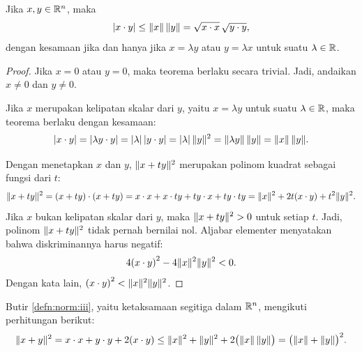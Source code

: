 \begin{thm}
Jika $x, y \in {\mathbb{R}}^n$, maka
\begin{equation*}
\sabs{x \cdot y} \leq \snorm{x} \, \snorm{y} = \sqrt{x\cdot x}\, \sqrt{y\cdot y},
\avoidbreak
\end{equation*}
dengan kesamaan jika dan hanya jika $x = \lambda y$ atau $y = \lambda x$ untuk suatu
$\lambda \in {\mathbb{R}}$.
\pagebreak[2]
\end{thm}

\begin{proof}
Jika $x=0$ atau $y = 0$, maka teorema berlaku secara trivial.
Jadi, andaikan $x \neq 0$ dan $y \neq 0$.

Jika $x$ merupakan kelipatan skalar dari $y$, yaitu $x = \lambda y$ untuk suatu
$\lambda \in {\mathbb{R}}$, maka teorema berlaku dengan kesamaan:
\begin{equation*}
\lvert { x \cdot y } \rvert =
\lvert {\lambda y \cdot y} \rvert = \lvert {\lambda} \rvert \, \lvert {y\cdot y} \rvert =
\lvert {\lambda} \rvert \, \lVert {y} \rVert^2 = \lVert {\lambda y} \rVert \, \lVert {y} \rVert
= \lVert {x} \rVert \, \lVert {y} \rVert .
\end{equation*}

Dengan menetapkan $x$ dan $y$,
$\lVert {x+ty} \rVert^2$
merupakan polinom kuadrat
sebagai fungsi dari $t$:
\begin{equation*}
\lVert {x+ty} \rVert^2
=
(x+ty) \cdot (x+ty)
=
x \cdot x + x \cdot ty + ty \cdot x + ty \cdot ty
=
\lVert {x} \rVert^2 + 2t(x \cdot y) + t^2 \lVert {y} \rVert^2 .
\end{equation*}
Jika $x$ bukan kelipatan skalar dari $y$, maka 
$\lVert {x+ty} \rVert^2 > 0$ untuk setiap $t$.  Jadi, polinom $\lVert {x+ty} \rVert^2$
tidak pernah bernilai nol.
Aljabar elementer menyatakan bahwa diskriminannya harus negatif:
\begin{equation*}
4 {(x \cdot y)}^2 - 4 \lVert {x} \rVert^2\lVert {y} \rVert^2 < 0.
\end{equation*}
Dengan kata lain, ${(x \cdot y)}^2 < \lVert {x} \rVert^2\lVert {y} \rVert^2$.
\end{proof}

Butir \ref{defn:norm:iii}, yaitu ketaksamaan segitiga dalam ${\mathbb{R}}^n$,
mengikuti perhitungan berikut:
\begin{equation*}
\lVert {x+y} \rVert^2 
=
x \cdot x + y \cdot y + 2 (x \cdot y)
\leq
\lVert {x} \rVert^2 + \lVert {y} \rVert^2 + 2 \bigl(\lVert {x} \rVert \,\lVert {y} \rVert\bigr)
=
{\bigl(\lVert {x} \rVert + \lVert {y} \rVert\bigr)}^2 .
\end{equation*}

